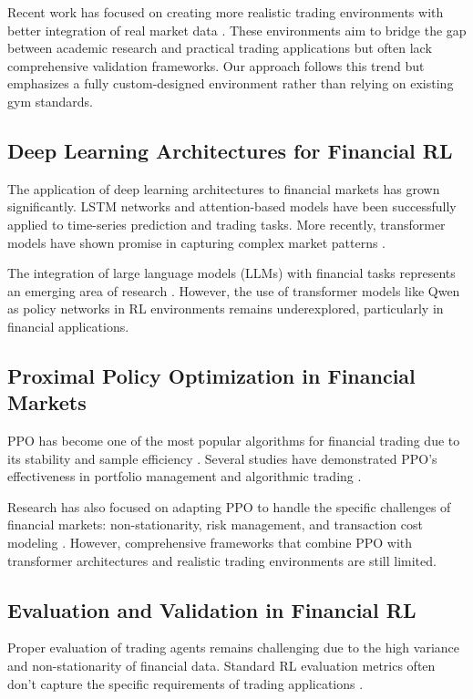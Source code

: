 \documentclass[10pt,journal]{IEEEtran}
\begin{document}
Recent work has focused on creating more realistic trading environments with better integration of real market data \cite{ref5,ref6}. These environments aim to bridge the gap between academic research and practical trading applications but often lack comprehensive validation frameworks. Our approach follows this trend but emphasizes a fully custom-designed environment rather than relying on existing gym standards.

\subsection{Deep Learning Architectures for Financial RL}
The application of deep learning architectures to financial markets has grown significantly. LSTM networks \cite{ref7} and attention-based models \cite{ref8} have been successfully applied to time-series prediction and trading tasks. More recently, transformer models have shown promise in capturing complex market patterns \cite{ref9}.

The integration of large language models (LLMs) with financial tasks represents an emerging area of research \cite{ref10}. However, the use of transformer models like Qwen as policy networks in RL environments remains underexplored, particularly in financial applications.

\subsection{Proximal Policy Optimization in Financial Markets}
PPO has become one of the most popular algorithms for financial trading due to its stability and sample efficiency \cite{ref11}. Several studies have demonstrated PPO's effectiveness in portfolio management and algorithmic trading \cite{ref12,ref13}.

Research has also focused on adapting PPO to handle the specific challenges of financial markets: non-stationarity, risk management, and transaction cost modeling \cite{ref14}. However, comprehensive frameworks that combine PPO with transformer architectures and realistic trading environments are still limited.

\subsection{Evaluation and Validation in Financial RL}
Proper evaluation of trading agents remains challenging due to the high variance and non-stationarity of financial data. Standard RL evaluation metrics often don't capture the specific requirements of trading applications \cite{ref15}.
\end{document}
